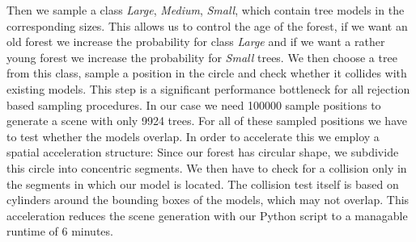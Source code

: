Then we sample a class \textit{Large}, \textit{Medium}, \textit{Small}, which contain tree models in the corresponding sizes.
This allows us to control the age of the forest, if we want an old forest we increase the probability for class \textit{Large} and if we want a rather young forest we increase the probability for \textit{Small} trees.
We then choose a tree from this class, sample a position in the circle and check whether it collides with existing models.
This step is a significant performance bottleneck for all rejection based sampling procedures.
In our case we need 100000 sample positions to generate a scene with only 9924 trees.
For all of these sampled positions we have to test whether the models overlap.
In order to accelerate this we employ a spatial acceleration structure: Since our forest has circular shape, we subdivide this circle into concentric segments.
We then have to check for a collision only in the segments in which our model is located.
The collision test itself is based on cylinders around the bounding boxes of the models, which may not overlap.
This acceleration reduces the scene generation with our Python script to a managable runtime of 6 minutes.

